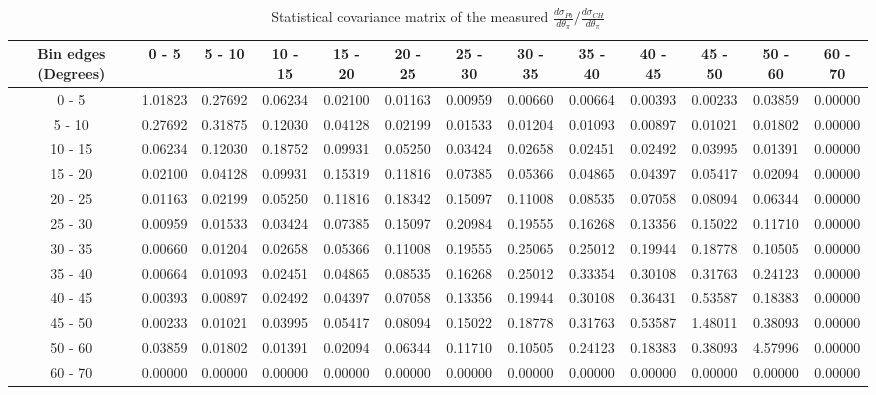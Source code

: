 \documentclass[aps,prl,twocolumn,superscriptaddress,nofootinbib]{revtex4-1}
\begin{document}
\begin{turnpage}
 \begin{table}[h!]
  \centering
  \caption{Statistical covariance matrix of the measured $\frac{d\sigma_{Pb}}{d\theta_{\pi}}/\frac{d\sigma_{CH}}{d\theta_{\pi}}$}
    \begin{tabular}{c||cccccccccccc}
      Bin edges (Degrees) & 0 - 5 & 5 - 10 & 10 - 15 & 15 - 20 & 20 - 25 & 25 - 30 & 30 - 35 & 35 - 40 & 40 - 45 & 45 - 50 & 50 - 60 & 60 - 70 \\
\hline \hline
        0 - 5 &  1.01823 &  0.27692 &  0.06234 &  0.02100 &  0.01163 &  0.00959 &  0.00660 &  0.00664 &  0.00393 &  0.00233 &  0.03859 &  0.00000 \\
       5 - 10 &  0.27692 &  0.31875 &  0.12030 &  0.04128 &  0.02199 &  0.01533 &  0.01204 &  0.01093 &  0.00897 &  0.01021 &  0.01802 &  0.00000 \\
      10 - 15 &  0.06234 &  0.12030 &  0.18752 &  0.09931 &  0.05250 &  0.03424 &  0.02658 &  0.02451 &  0.02492 &  0.03995 &  0.01391 &  0.00000 \\
      15 - 20 &  0.02100 &  0.04128 &  0.09931 &  0.15319 &  0.11816 &  0.07385 &  0.05366 &  0.04865 &  0.04397 &  0.05417 &  0.02094 &  0.00000 \\
      20 - 25 &  0.01163 &  0.02199 &  0.05250 &  0.11816 &  0.18342 &  0.15097 &  0.11008 &  0.08535 &  0.07058 &  0.08094 &  0.06344 &  0.00000 \\
      25 - 30 &  0.00959 &  0.01533 &  0.03424 &  0.07385 &  0.15097 &  0.20984 &  0.19555 &  0.16268 &  0.13356 &  0.15022 &  0.11710 &  0.00000 \\
      30 - 35 &  0.00660 &  0.01204 &  0.02658 &  0.05366 &  0.11008 &  0.19555 &  0.25065 &  0.25012 &  0.19944 &  0.18778 &  0.10505 &  0.00000 \\
      35 - 40 &  0.00664 &  0.01093 &  0.02451 &  0.04865 &  0.08535 &  0.16268 &  0.25012 &  0.33354 &  0.30108 &  0.31763 &  0.24123 &  0.00000 \\
      40 - 45 &  0.00393 &  0.00897 &  0.02492 &  0.04397 &  0.07058 &  0.13356 &  0.19944 &  0.30108 &  0.36431 &  0.53587 &  0.18383 &  0.00000 \\
      45 - 50 &  0.00233 &  0.01021 &  0.03995 &  0.05417 &  0.08094 &  0.15022 &  0.18778 &  0.31763 &  0.53587 &  1.48011 &  0.38093 &  0.00000 \\
      50 - 60 &  0.03859 &  0.01802 &  0.01391 &  0.02094 &  0.06344 &  0.11710 &  0.10505 &  0.24123 &  0.18383 &  0.38093 &  4.57996 &  0.00000 \\
      60 - 70 &  0.00000 &  0.00000 &  0.00000 &  0.00000 &  0.00000 &  0.00000 &  0.00000 &  0.00000 &  0.00000 &  0.00000 &  0.00000 &  0.00000 \\
    \end{tabular}
  \label{tablecov:Pb_Statistical_ThetaPi}
  \end{table}
\end{turnpage}
\end{document}
